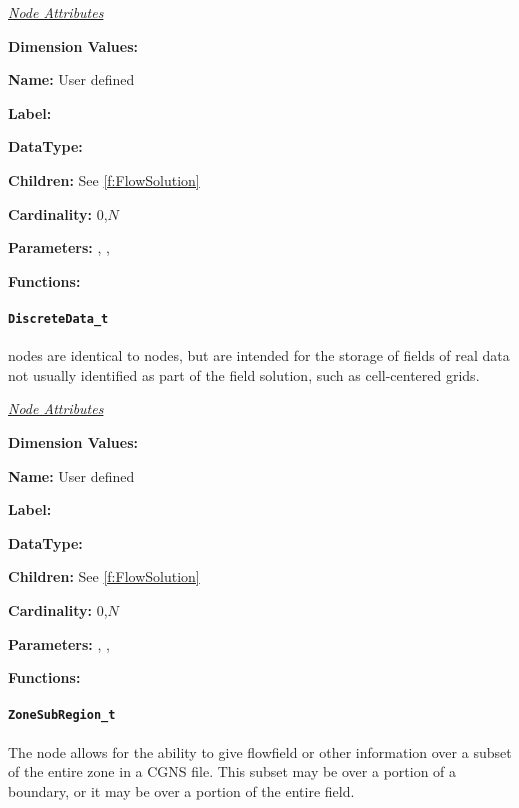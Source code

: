\textit{\uline{Node Attributes}}
\begin{Ventryic}{\textbf{Dimension Values:}}
\item [\textbf{Name:}]
      User defined
\item [\textbf{Label:}]
\item [\textbf{DataType:}]
\item [\textbf{Children:}]
      See \autoref{f:FlowSolution}
\item [\textbf{Cardinality:}]
      0,$N$
\item [\textbf{Parameters:}]
      , , 
\item [\textbf{Functions:}]
\end{Ventryic}

\paragraph{\texttt{DiscreteData\_t}}

 nodes are identical to 
nodes, but are intended for the storage of fields of real data not
usually identified as part of the field solution, such as cell-centered
grids.

\textit{\uline{Node Attributes}}
\begin{Ventryic}{\textbf{Dimension Values:}}
\item [\textbf{Name:}]
      User defined
\item [\textbf{Label:}]
\item [\textbf{DataType:}]
\item [\textbf{Children:}]
      See \autoref{f:FlowSolution}
\item [\textbf{Cardinality:}]
      0,$N$
\item [\textbf{Parameters:}]
      , , 
\item [\textbf{Functions:}]
\end{Ventryic}

\paragraph{\texttt{ZoneSubRegion\_t}}

The  node allows for the ability to give flowfield or
other information over a subset of the entire zone in a CGNS file.
This subset may be over a portion of a boundary, or it may be over a portion
of the entire field.

